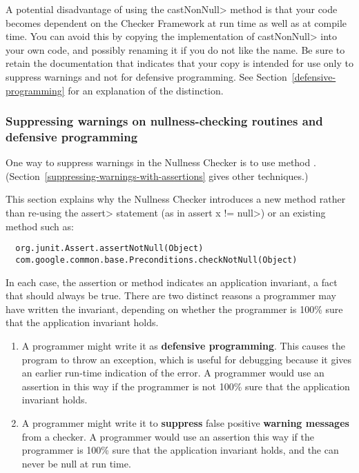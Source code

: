 \begin{enumerate}
  A potential disadvantage of using the \<castNonNull> method is that your
  code becomes dependent on the Checker Framework at run time as well as at
  compile time.  You can avoid this by copying the implementation of
  \<castNonNull> into your own code, and possibly renaming it if you do not
  like the name.  Be sure to retain the documentation that indicates that
  your copy is intended for use only to suppress warnings and not for
  defensive programming.  See Section~\ref{defensive-programming} for an
  explanation of the distinction.

\end{enumerate}


\subsubsection{Suppressing warnings on nullness-checking routines and defensive programming\label{defensive-programming}}

% 


One way to suppress warnings in the Nullness Checker is to use
method .
(Section~\ref{suppressing-warnings-with-assertions} gives other techniques.)

This section explains why the Nullness Checker introduces a new method
rather than re-using the \<assert> statement (as in
\<assert x != null>) or an existing method such as:

\begin{Verbatim}
  org.junit.Assert.assertNotNull(Object)
  com.google.common.base.Preconditions.checkNotNull(Object)
\end{Verbatim}

In each case, the assertion or method indicates an application invariant, a
fact that should always be true.  There are two distinct reasons a
programmer may have written the invariant, depending on whether the
programmer is 100\% sure that the application invariant holds.

\begin{enumerate}
\item
  A programmer might write it as \textbf{defensive programming}.  This causes
  the program to throw an exception, which is useful for debugging because
  it gives an earlier run-time indication of the error.
  A programmer would use an assertion in this way if the programmer is not
  100\% sure that the application invariant holds.


\item
  A programmer might write it to \textbf{suppress} false positive
  \textbf{warning messages} from a checker.  A programmer would use an
  assertion this way if the programmer is 100\% sure that the application
  invariant holds, and the can never be null at run time.

\end{enumerate}

